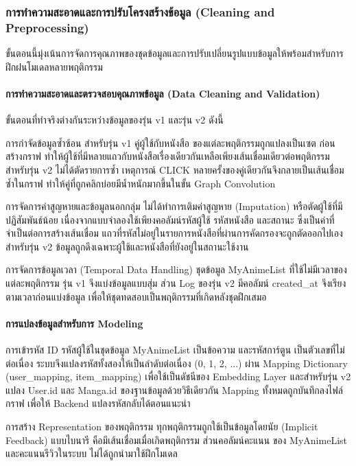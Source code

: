 \subsubsection{การทำความสะอาดและการปรับโครงสร้างข้อมูล (Cleaning and Preprocessing)}
ขั้นตอนนี้มุ่งเน้นการจัดการคุณภาพของชุดข้อมูลและการปรับเปลี่ยนรูปแบบข้อมูลให้พร้อมสำหรับการฝึกฝนโมเดลหลายพฤติกรรม

\paragraph{การทำความสะอาดและตรวจสอบคุณภาพข้อมูล (Data Cleaning and Validation)}
ขั้นตอนที่ทำจริงต่างกันระหว่างข้อมูลของรุ่น v1 และรุ่น v2 ดังนี้

การกำจัดข้อมูลซ้ำซ้อน สำหรับรุ่น v1 คู่ผู้ใช้กับหนังสือ ของแต่ละพฤติกรรมถูกแปลงเป็นเซต ก่อนสร้างกราฟ ทำให้ผู้ใช้ที่มีหลายแถวกับหนังสือเรื่องเดียวกันเหลือเพียงเส้นเชื่อมเดียวต่อพฤติกรรม สำหรับรุ่น v2 ไม่ได้ตัดรายการซ้ำ เหตุการณ์ CLICK หลายครั้งของคู่เดียวกันจึงกลายเป็นเส้นเชื่อมซ้ำในกราฟ ทำให้คู่ที่ถูกคลิกบ่อยมีน้ำหนักมากขึ้นในขั้น Graph Convolution

การจัดการค่าสูญหายและข้อมูลนอกกลุ่ม ไม่ได้ทำการเติมค่าสูญหาย (Imputation) หรือตัดผู้ใช้ที่มีปฏิสัมพันธ์น้อย เนื่องจากแบบจำลองใช้เพียงคอลัมน์รหัสผู้ใช้ รหัสหนังสือ และสถานะ ซึ่งเป็นค่าที่จำเป็นต่อการสร้างเส้นเชื่อม แถวที่รหัสไม่อยู่ในรายการหนังสือที่ผ่านการคัดกรองจะถูกตัดออกไปเอง สำหรับรุ่น v2 ข้อมูลถูกดึงเฉพาะผู้ใช้และหนังสือที่ยังอยู่ในสถานะใช้งาน 

การจัดการข้อมูลเวลา (Temporal Data Handling) ชุดข้อมูล MyAnimeList ที่ใช้ไม่มีเวลาของแต่ละพฤติกรรม รุ่น v1 จึงแบ่งข้อมูลแบบสุ่ม ส่วน Log ของรุ่น v2 มีคอลัมน์ created\_at จึงเรียงตามเวลาก่อนแบ่งข้อมูล เพื่อให้ชุดทดสอบเป็นพฤติกรรมที่เกิดหลังชุดฝึกเสมอ

\paragraph{การแปลงข้อมูลสำหรับการ Modeling}

การเข้ารหัส ID รหัสผู้ใช้ในชุดข้อมูล MyAnimeList เป็นข้อความ และรหัสการ์ตูน เป็นตัวเลขที่ไม่ต่อเนื่อง ระบบจึงแปลงรหัสทั้งสองให้เป็นลำดับต่อเนื่อง (0, 1, 2, ...) ผ่าน Mapping Dictionary (user\_mapping, item\_mapping) เพื่อใช้เป็นดัชนีของ Embedding Layer และสำหรับรุ่น v2 แปลง User.id และ Manga.id ของฐานข้อมูลด้วยวิธีเดียวกัน Mapping ทั้งหมดถูกบันทึกลงไฟล์กราฟ เพื่อให้ Backend แปลงรหัสกลับได้ตอนแนะนำ

การสร้าง Representation ของพฤติกรรม ทุกพฤติกรรมถูกใช้เป็นข้อมูลโดยนัย (Implicit Feedback) แบบไบนารี คือมีเส้นเชื่อมเมื่อเกิดพฤติกรรม ส่วนคอลัมน์คะแนน ของ MyAnimeList และคะแนนรีวิวในระบบ ไม่ได้ถูกนำมาใช้ฝึกโมเดล

